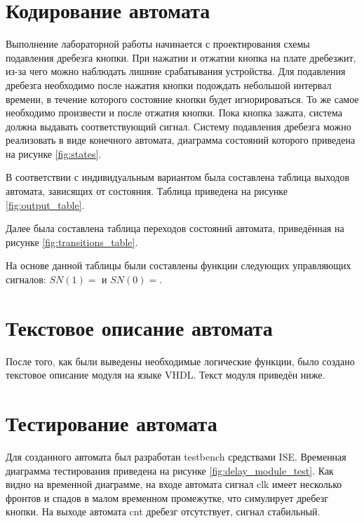 \documentclass[a4paper, 14pt]{extarticle}
\begin{document}
    \section{Кодирование автомата}
    Выполнение лабораторной работы начинается с проектирования схемы подавления дребезга кнопки.
    При нажатии и отжатии кнопка на плате дребезжит, из-за чего можно наблюдать лишние срабатывания устройства.
    Для подавления дребезга необходимо после нажатия кнопки подождать небольшой интервал времени, в течение которого состояние кнопки будет игнорироваться.
    То же самое необходимо произвести и после отжатия кнопки. Пока кнопка зажата, система должна выдавать соответствующий сигнал.
    Систему подавления дребезга можно реализовать в виде конечного автомата, диаграмма состояний которого приведена на рисунке \ref{fig:states}.

    В соответствии с индивидуальным вариантом была составлена таблица выходов автомата, зависящих от состояния.
    Таблица приведена на рисунке \ref{fig:output_table}.

    Далее была составлена таблица переходов состояний автомата, приведённая на рисунке \ref{fig:transitions_table}.

    На основе данной таблицы были составлены функции следующих управляющих сигналов: $SN(1)=$ и $SN(0)=$.

    \section{Текстовое описание автомата}
    После того, как были выведены необходимые логические функции, было создано текстовое описание модуля на языке VHDL. Текст модуля приведён ниже.

    \section{Тестирование автомата}
    Для созданного автомата был разработан testbench средствами ISE.
    Временная диаграмма тестирования приведена на рисунке \ref{fig:delay_module_test}.
    Как видно на временной диаграмме, на входе автомата сигнал clk имеет несколько фронтов и спадов в малом временном промежутке, что симулирует дребезг кнопки.
    На выходе автомата cnt дребезг отсутствует, сигнал стабильный.
\end{document}
